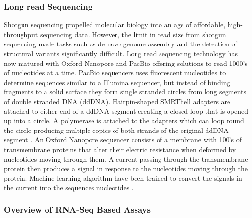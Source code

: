 \documentclass[../main.tex]{subfiles}
\begin{document}
\subsubsection{Long read Sequencing}

Shotgun sequencing propelled molecular biology into an age of affordable, high-throughput sequencing data.
However, the limit in read size from shotgun sequencing made tasks such as de novo genome assembly and the detection of structural variants significantly difficult.
Long read sequencing technology has now matured with Oxford Nanopore and PacBio offering solutions to read 1000's of nucleotides at a time. 
PacBio sequencers uses fluorescent nucleotides to determine sequences similar to a Illumina sequencer, but instead of binding fragments to a solid surface they form single stranded circles from long segments of double stranded DNA (ddDNA).
Hairpin-shaped SMRTbell adapters are attached to either end of a ddDNA segment creating a closed loop that is opened up into a circle. 
A polymerase is attached to the adapters which can loop round the circle producing multiple copies of both strands of the original ddDNA segment \parencite{Hu2021}.
An Oxford Nanopore sequencer consists of a membrane with 100's of transmembrane proteins that alter their electric resistance when deformed by nucleotides moving through them.  
A current passing through the transmembrane protein then produces a signal in response to the nucleotides moving through the protein.
Machine learning algorithm have been trained to convert the signals in the current into the sequences nucleotides \parencite{Jain2016}.

\subsubsection{Overview of RNA-Seq Based Assays}
\end{document}
